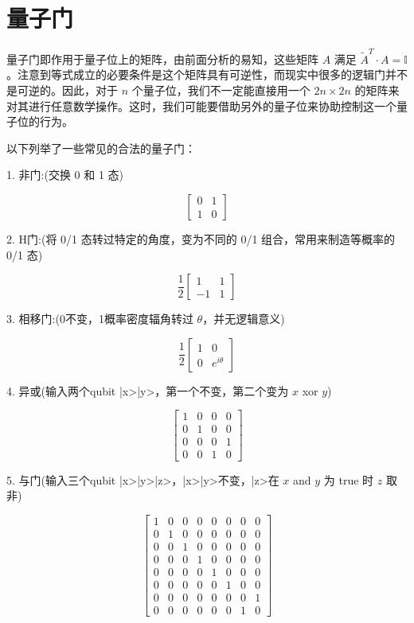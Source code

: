 \documentclass[fontset=windows]{article}
\begin{document}
\section{量子门}

量子门即作用于量子位上的矩阵，由前面分析的易知，这些矩阵 $A$ 满足 $\tilde A^T \cdot A = \mathbb{I}$ 。注意到等式成立的必要条件是这个矩阵具有可逆性，而现实中很多的逻辑门并不是可逆的。因此，对于 $n$ 个量子位，我们不一定能直接用一个 $2n \times 2n$ 的矩阵来对其进行任意数学操作。这时，我们可能要借助另外的量子位来协助控制这一个量子位的行为。

以下列举了一些常见的合法的量子门：

1. 非门:(交换 0 和 1 态)

$$
\begin{bmatrix} 
0 & 1 \\
1 & 0
 \end{bmatrix}
$$

2. H门:(将 0/1 态转过特定的角度，变为不同的 0/1 组合，常用来制造等概率的 0/1 态)

$$
\frac{1}{2} 
\begin{bmatrix} 
 1 & 1 \\
-1 & 1
 \end{bmatrix}
$$

3. 相移门:(0不变，1概率密度辐角转过 $\theta$，并无逻辑意义)

$$
\frac{1}{2} 
\begin{bmatrix} 
1 & 0 \\
0 & e^{i\theta}
 \end{bmatrix}
$$

4. 异或(输入两个qubit |x>|y>，第一个不变，第二个变为 $x$ xor $y$)

$$
\begin{bmatrix} 
1 & 0 & 0 & 0 \\
0 & 1 & 0 & 0 \\
0 & 0 & 0 & 1 \\
0 & 0 & 1 & 0
 \end{bmatrix}
$$

5. 与门(输入三个qubit |x>|y>|z>，|x>|y>不变，|z>在 $x$ and $y$ 为 true 时 $z$ 取非)

$$
\begin{bmatrix}
1 & 0 & 0 & 0 & 0 & 0 & 0 & 0 \\
0 & 1 & 0 & 0 & 0 & 0 & 0 & 0 \\
0 & 0 & 1 & 0 & 0 & 0 & 0 & 0 \\
0 & 0 & 0 & 1 & 0 & 0 & 0 & 0 \\
0 & 0 & 0 & 0 & 1 & 0 & 0 & 0 \\
0 & 0 & 0 & 0 & 0 & 1 & 0 & 0 \\
0 & 0 & 0 & 0 & 0 & 0 & 0 & 1 \\
0 & 0 & 0 & 0 & 0 & 0 & 1 & 0
 \end{bmatrix}
$$
\end{document}
